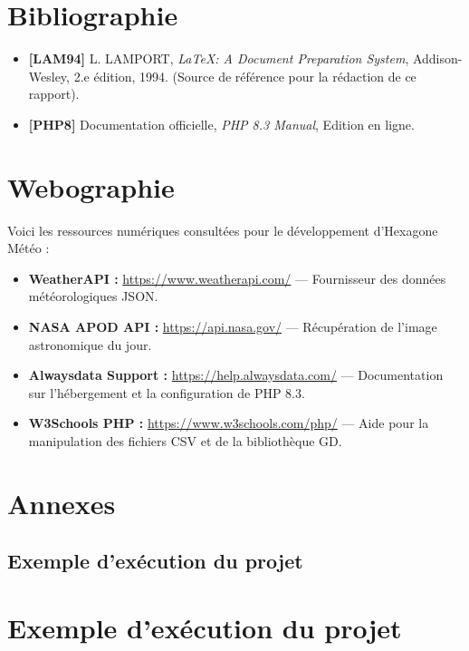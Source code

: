 \documentclass[12pt,a4paper]{article}
\begin{document}
\vfill
{} \par
\newpage

\newpage
\section{Bibliographie}
\begin{itemize}
    \item \textbf{[LAM94]} L. LAMPORT, \textit{LaTeX: A Document Preparation System}, Addison-Wesley, 2.e édition, 1994. (Source de référence pour la rédaction de ce rapport).
    \item \textbf{[PHP8]} Documentation officielle, \textit{PHP 8.3 Manual}, Edition en ligne.
\end{itemize}

\section{Webographie}
Voici les ressources numériques consultées pour le développement d'Hexagone Météo :
\begin{itemize}
    \item \textbf{WeatherAPI :} \url{https://www.weatherapi.com/} — Fournisseur des données météorologiques JSON.
    \item \textbf{NASA APOD API :} \url{https://api.nasa.gov/} — Récupération de l'image astronomique du jour.
    \item \textbf{Alwaysdata Support :} \url{https://help.alwaysdata.com/} — Documentation sur l'hébergement et la configuration de PHP 8.3.
    \item \textbf{W3Schools PHP :} \url{https://www.w3schools.com/php/} — Aide pour la manipulation des fichiers CSV et de la bibliothèque GD.
\end{itemize}

\newpage
\section{Annexes}

\subsection{Exemple d'exécution du projet}
\section{Exemple d'exécution du projet}
\end{document}
